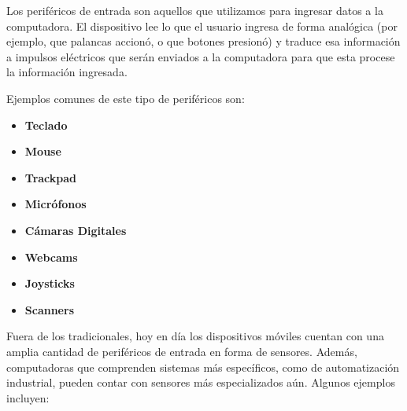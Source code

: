 Los periféricos de entrada son aquellos que utilizamos para ingresar datos a la
computadora. El dispositivo lee lo que el usuario ingresa de forma analógica
(por ejemplo, que palancas accionó, o que botones presionó) y traduce esa
información a impulsos eléctricos que serán enviados a la computadora para que
esta procese la información ingresada.\autocite[p. 246]{laplante_2000}

Ejemplos comunes de este tipo de periféricos son:

\begin{minipage}{0.45\textwidth}
    \begin{itemize}
        \item \textbf{Teclado}
        \item \textbf{Mouse}
        \item \textbf{Trackpad}
        \item \textbf{Micrófonos}
    \end{itemize}
\end{minipage}
\begin{minipage}{0.45\textwidth}
    \begin{itemize}
        \item \textbf{Cámaras Digitales}
        \item \textbf{Webcams}
        \item \textbf{Joysticks}
        \item \textbf{Scanners}
    \end{itemize}
\end{minipage}

Fuera de los tradicionales, hoy en día los dispositivos móviles cuentan con una
amplia cantidad de periféricos de entrada en forma de sensores. Además,
computadoras que comprenden sistemas más específicos, como de automatización
industrial, pueden contar con sensores más especializados aún. Algunos ejemplos
incluyen:

